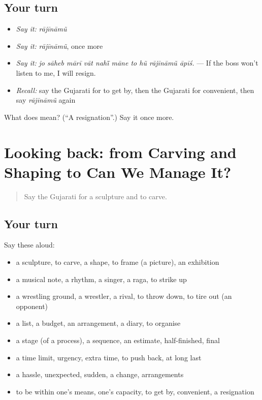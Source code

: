 \subsection*{Your turn}
\begin{itemize}
\raggedright
  \item \emph{Say it:} \emph{rājīnāmũ}
  \item \emph{Say it:} \emph{rājīnāmũ}, once more
  \item \emph{Say it:} \emph{jo sāheb mārī vāt nahī̃ māne to hũ rājīnāmũ āpīś.} — If the boss won't listen to me, I will resign.
  \item \emph{Recall:} say the Gujarati for to get by, then the Gujarati for convenient, then say \emph{rājīnāmũ} again
\end{itemize}

\begin{tcolorbox}[breakable,colback=teal!4,colframe=teal!35!black,title={Before you move on}]
What does  mean? (\textquotedblleft{}A resignation\textquotedblright{}.) Say it once more.
\end{tcolorbox}
\section[(dialogue)]{Looking back: from Carving and Shaping to Can We Manage It?}

\label{lesson:GU-R532-review-525-532}



\begin{quote}
Say the Gujarati for a sculpture and to carve.
\end{quote}

\subsection*{Your turn}
Say these aloud:

\begin{itemize}
\raggedright
  \item a sculpture, to carve, a shape, to frame (a picture), an exhibition
  \item a musical note, a rhythm, a singer, a raga, to strike up
  \item a wrestling ground, a wrestler, a rival, to throw down, to tire out (an opponent)
  \item a list, a budget, an arrangement, a diary, to organise
  \item a stage (of a process), a sequence, an estimate, half-finished, final
  \item a time limit, urgency, extra time, to push back, at long last
  \item a hassle, unexpected, sudden, a change, arrangements
  \item to be within one's means, one's capacity, to get by, convenient, a resignation
\end{itemize}

